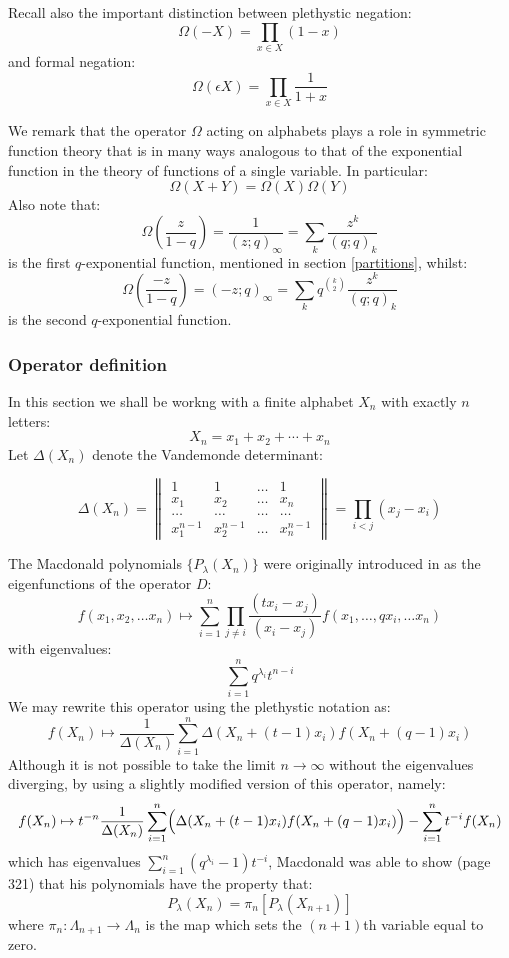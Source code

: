 \documentclass[12pt,dvips]{amsart}
\begin{document}
Recall also the important distinction between plethystic negation:
\begin{equation*}
\Omega(-X) = \prod_{x \in X} (1 - x) 
\end{equation*}
and formal negation:
\begin{equation*}
\Omega(\epsilon X) = \prod_{x \in X} \frac{1}{1 + x}
\end{equation*}

We remark that the operator $\Omega$ acting on alphabets plays a role in symmetric function theory that is in many ways analogous to that of the exponential function in the theory of functions of a single variable. In particular:
$$ \Omega(X + Y) = \Omega(X) \Omega(Y) $$
Also note that:
$$ \Omega \left ( \frac{z}{1-q} \right ) = \frac{1}{(z;q)_\infty} = \sum_k \frac{z^k}{(q;q)_k} $$
is the first $q$-exponential function, mentioned in section \ref{partitions}, whilst:
$$ \Omega \left ( \frac{-z}{1-q} \right ) = (-z;q)_\infty = \sum_k q^{\binom{k}{2}} \frac{z^k}{(q;q)_k}$$
is the second $q$-exponential function.



\subsubsection{Operator definition}

\noindent
In this section we shall be workng with a finite alphabet $X_n$ with exactly $n$ letters:
$$ X_n = x_1 + x_2 + \cdots + x_n $$
Let $\Delta(X_n)$ denote the Vandemonde determinant:

$$ \Delta(X_n) = \left \|
\begin{array}{cccc}
1 & 1 & \ldots & 1 \\
x_1 & x_2 & \ldots & x_n \\
\ldots & \ldots & \ldots & \ldots \\
x_1^{n-1} & x_2^{n-1} & \ldots & x_n^{n-1}
\end{array}
\right \| = \prod_{i < j} (x_j - x_i) $$

\medskip
\noindent
The Macdonald polynomials $\{ P_\lambda(X_n) \}$ were originally introduced in \cite{MAC} as the eigenfunctions of the operator $D$:
$$ f(x_1, x_2, \ldots x_n) \mapsto \sum_{i = 1}^n \prod_{j \neq i} \frac{(tx_i - x_j)}{(x_i - x_j)} f(x_1, \ldots, q x_i, \ldots x_n) $$
with eigenvalues:
$$ \sum_{i=1}^n q^{\lambda_i} t^{n-i} $$
We may rewrite this operator using the plethystic notation \cite{LASCOUX, GARSIA1, GARSIA2} as:
$$ f(X_n) \mapsto \frac{1}{\Delta(X_n)} \sum_{i=1}^n \Delta(X_n + (t-1)x_i) f(X_n + (q-1)x_i) $$
Although it is not possible to take the limit $n \to \infty$ without the eigenvalues diverging, by using a slightly modified version of this operator, namely:
$$ f(X_n) \mapsto t^{-n}  \frac{1}{\Delta(X_n)} \sum_{i=1}^n  \Bigl ( \Delta(X_n + (t-1)x_i) f(X_n + (q-1)x_i) \Bigr ) - \sum_{i=1}^n t^{-i} f(X_n) $$
which has eigenvalues
$ \sum_{i = 1}^n ( q^{\lambda_i} - 1)t^{-i} $,
Macdonald was able to show \cite{BLACK} (page 321) that his polynomials have the property that:
$$ P_\lambda(X_n) = \pi_n[ P_\lambda(X_{n+1}) ] $$
where $\pi_n : \Lambda_{n+1} \to \Lambda_n$ is the map which sets the $(n+1)$th variable equal to zero.
\end{document}
